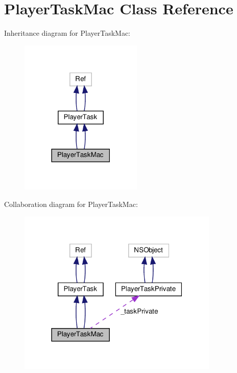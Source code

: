 \hypertarget{classPlayerTaskMac}{}\section{Player\+Task\+Mac Class Reference}
\label{classPlayerTaskMac}


Inheritance diagram for Player\+Task\+Mac\+:
\nopagebreak
\begin{figure}[H]
\begin{center}
\leavevmode
\includegraphics[width=165pt]{classPlayerTaskMac__inherit__graph}
\end{center}
\end{figure}


Collaboration diagram for Player\+Task\+Mac\+:
\nopagebreak
\begin{figure}[H]
\begin{center}
\leavevmode
\includegraphics[width=271pt]{classPlayerTaskMac__coll__graph}
\end{center}
\end{figure}
